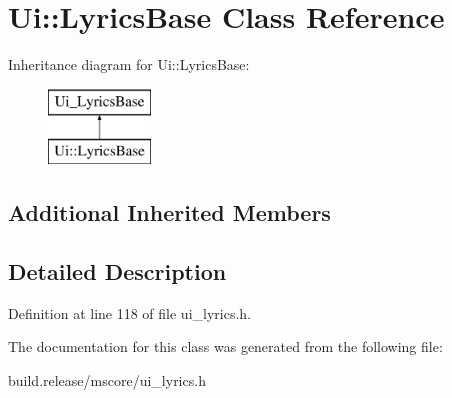 \hypertarget{class_ui_1_1_lyrics_base}{}\section{Ui\+:\+:Lyrics\+Base Class Reference}
\label{class_ui_1_1_lyrics_base}
Inheritance diagram for Ui\+:\+:Lyrics\+Base\+:\begin{figure}[H]
\begin{center}
\leavevmode
\includegraphics[height=2.000000cm]{class_ui_1_1_lyrics_base}
\end{center}
\end{figure}
\subsection*{Additional Inherited Members}


\subsection{Detailed Description}


Definition at line 118 of file ui\+\_\+lyrics.\+h.



The documentation for this class was generated from the following file\+:\begin{DoxyCompactItemize}
\item 
build.\+release/mscore/ui\+\_\+lyrics.\+h\end{DoxyCompactItemize}
